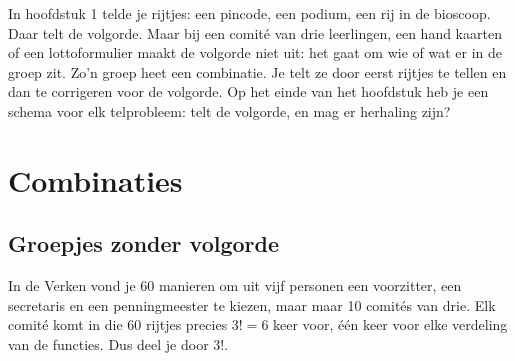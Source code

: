 %



In hoofdstuk 1 telde je rijtjes: een pincode, een podium, een rij in de bioscoop. Daar telt de volgorde. Maar bij een comité van drie leerlingen, een hand kaarten of een lottoformulier maakt de volgorde niet uit: het gaat om wie of wat er in de groep zit. Zo'n groep heet een combinatie. Je telt ze door eerst rijtjes te tellen en dan te corrigeren voor de volgorde. Op het einde van het hoofdstuk heb je een schema voor elk telprobleem: telt de volgorde, en mag er herhaling zijn?

\begin{oefeningen}[Start]

\end{oefeningen}


\section{Combinaties}

\subsection{Groepjes zonder volgorde}

In de Verken vond je 60 manieren om uit vijf personen een voorzitter, een secretaris en een penningmeester te kiezen, maar maar 10 comités van drie. Elk comité komt in die 60 rijtjes precies $3! = 6$ keer voor, één keer voor elke verdeling van de functies. Dus deel je door $3!$.

